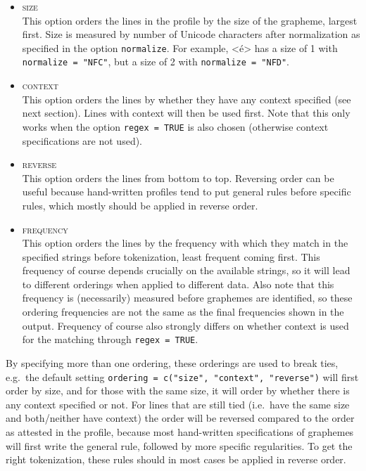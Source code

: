\begin{itemize}
  
   \item \textsc{size}\\
         This option orders the lines in the profile by the size of the
         grapheme, largest first. Size is measured by number of Unicode
         characters after normalization as specified in the option
         \texttt{normalize}. For example, <é> has a size of 1 with
         \texttt{normalize = "NFC"}, but a size of 2 with
         \texttt{normalize = "NFD"}.

   \item \textsc{context}\\ This option orders the lines by whether they have
           any context specified (see next section). Lines with context will
           then be used first. Note that this only works when the option
           \texttt{regex = TRUE} is also chosen (otherwise context
           specifications are not used).

   \item \textsc{reverse}\\ This option orders the lines from bottom to top.
         Reversing order can be useful because hand-written profiles tend to put
         general rules before specific rules, which mostly should be applied in
         reverse order.

  \item \textsc{frequency}\\
         This option orders the lines by the frequency with which they
         match in the specified strings before tokenization, least frequent
         coming first. This frequency of course depends crucially on the
         available strings, so it will lead to different orderings when applied
         to different data. Also note that this frequency is (necessarily)
         measured before graphemes are identified, so these ordering frequencies
         are not the same as the final frequencies shown in the output.
         Frequency of course also strongly differs on whether context is used
         for the matching through \texttt{regex = TRUE}.
  
\end{itemize}

By specifying more than one ordering, these orderings are used to break ties,
e.g.\ the default setting \texttt{ordering = c("size", "context", "reverse")}
will first order by size, and for those with the same size, it will order by
whether there is any context specified or not. For lines that are still tied
(i.e.\ have the same size and both/neither have context) the order will be
reversed compared to the order as attested in the profile, because most
hand-written specifications of graphemes will first write the general rule,
followed by more specific regularities. To get the right tokenization, these 
rules should in most cases be applied in reverse order.

